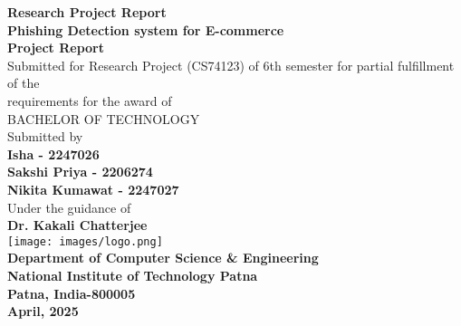 \begin{titlepage}
    \centering
    \Large \textbf {Research Project Report }\\[0.3in]
    \Large \textbf {Phishing Detection system for E-commerce}\\[0.4in]
    \large{ \textbf{Project Report} \\[0.1in]  {Submitted for Research Project (CS74123) of
6th semester for partial fulfillment of the} \\[0.1in] {requirements for the award of}\\[0.2in] \textsc{BACHELOR OF TECHNOLOGY} \\[0.2in]
    }
    \normalsize Submitted by \\[0.2in]
    
    \textbf{{ Isha } { - 2247026}} \\
    \textbf{{ Sakshi Priya} { - 2206274}} \\
    \textbf{{ Nikita Kumawat} { - 2247027}} \\
        
    \vspace{.2in}
    Under the guidance of\\[0.2in]
    \textbf{\large{Dr. Kakali Chatterjee}}\\[0.3in]
    
        
    \texttt{[image: images/logo.png]}\\[0.3in]

      
    \textbf {Department of Computer Science \& Engineering }\\
    \textbf {National Institute of Technology Patna}\\
    \textbf {Patna, India-800005}\\[0.2in]
    \textbf {April, 2025}\\[0.2in]
    
    
    
\end{titlepage}
